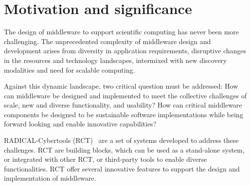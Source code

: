 \documentclass[preprint,12pt, a4paper]{elsarticle}
\begin{document}
\section{Motivation and significance}\label{sec:motivation}


The design of middleware to support scientific computing has never been more
challenging. The unprecedented complexity of middleware design and development
arises from diversity in application requirements, disruptive changes in the
resources and technology landscapes, intermixed with new discovery modalities
and need for scalable computing.

Against this dynamic landscape, two critical question must be addressed:
How can middleware be designed and implemented to meet the collective
challenges of scale, new and diverse functionality, and usability? How can
critical middleware components be designed to be sustainable software
implementations while being forward looking and enable innovative
capabilities?

RADICAL-Cybertools (RCT)~\cite{github-rct} are a set of systems developed to
address these challenges.  RCT are building blocks, which can be used as a
stand-alone system, or integrated with other RCT, or third-party tools to
enable diverse functionalities. RCT offer several innovative features to
support the design and implementation of middleware.
\end{document}
